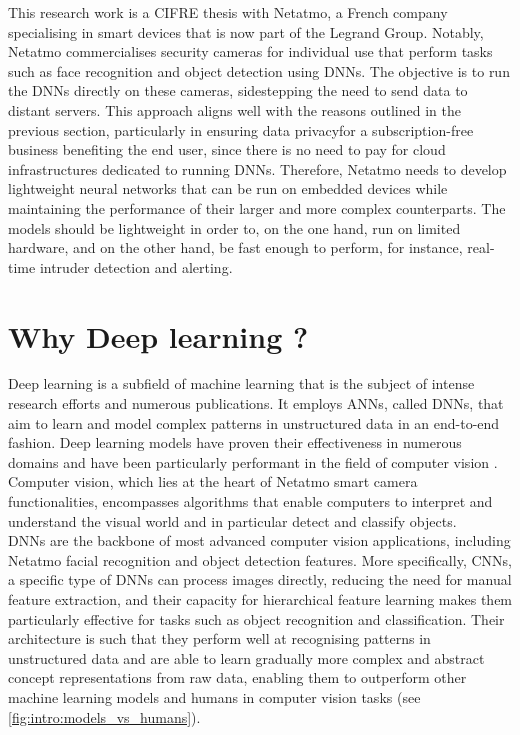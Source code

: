 This research work is a CIFRE thesis with Netatmo, a French company specialising
in smart devices that is now part of the Legrand Group. Notably, Netatmo
commercialises security cameras for individual use that perform tasks such as
face recognition and object detection using \acp{DNN}. The objective is to run
the \acp{DNN} directly on these cameras, sidestepping the need to send data to
distant servers. This approach aligns well with the reasons outlined in the
previous section, particularly in ensuring data privacy\DIFdelbegin {}\DIFdelend \DIFaddbegin {}\DIFaddend for
a subscription-free business benefiting the end user, since there is no need to
pay for cloud infrastructures dedicated to running \acp{DNN}. Therefore, Netatmo
needs to develop lightweight neural networks that can be run on embedded devices
while maintaining the performance of their larger and more complex counterparts.
The models should be lightweight in order to, on the one hand, run on limited
hardware, and on the other hand, be fast enough to perform, for instance,
real-time intruder detection and alerting.\\

\section{Why Deep learning ?}

Deep learning is a subfield of machine learning that is the subject of intense
research efforts and numerous publications. It employs \aclp{ANN}, called
\acfp{DNN}, that aim to learn and model complex patterns in unstructured data in
an end-to-end fashion. Deep learning models have proven their effectiveness in
numerous domains and have been particularly performant in the field of computer
vision
\DIFdelbegin {}\DIFdelend \cite{DBLP:conf/cvpr/HeZRS16,DBLP:conf/nips/RenHGS15,DBLP:conf/eccv/LiuAESRFB16}.
Computer vision, which lies at the heart of Netatmo smart camera
functionalities, encompasses algorithms that enable computers to interpret and
understand the visual world and in particular detect and classify objects.\\

\acp{DNN} are the backbone of most advanced computer vision applications,
including Netatmo facial recognition and object detection features. More
specifically, \acp{CNN}, a specific type of \acp{DNN} can process images
directly, reducing the need for manual feature extraction, and their capacity
for hierarchical feature learning makes them particularly effective for tasks
such as object recognition and classification. Their architecture is such that
they perform well at recognising patterns in unstructured data and are able to
learn gradually more complex and abstract concept representations from \DIFdelbegin {}\DIFdelend raw data,
enabling them to outperform other machine learning models and humans in computer
vision tasks (see \cref{fig:intro:models_vs_humans}).\\

